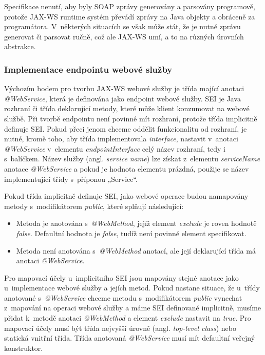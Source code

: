 \documentclass[11pt,twoside,a4paper]{book}
\begin{document}
Specifikace nenutí, aby byly SOAP zprávy generovány a parsovány programově, protože
JAX-WS runtime systém převádí zprávy na Java objekty a obráceně za programátora.
V~některých situacích se však může stát, že je nutné zprávu generovat či parsovat ručně, což ale
JAX-WS umí, a to na různých úrovních abstrakce.

\subsubsection{Implementace endpointu webové služby}
\label{subsec:implementace-endpointu-webove-sluzby}

Výchozím bodem pro tvorbu JAX-WS webové služby je třída mající anotaci {\em
@WebService}, která je definována jako endpoint webové služby. SEI je Java
rozhraní či třída deklarující metody, které může klient konzumovat na
webové službě. Při tvorbě endpointu není povinné mít rozhraní, protože třída
implicitně definuje SEI. Pokud přeci jenom chceme oddělit funkcionalitu od
rozhraní, je nutné, kromě toho, aby třída implementovala {\em interface}, nastavit v~anotaci
{\em @WebService} v~elementu {\em endpointInterface} celý název rozhraní, tedy
i s~balíčkem.
Název služby (angl. {\em service name}) lze získat z~elementu {\em serviceName}
anotace {\em @WebService} a pokud je hodnota elementu prázdná, použije se název
implementující třídy s~příponou „Service“.

Pokud třída implicitně definuje SEI, jako webové operace budou namapovány metody
s~modifikátorem {\em public}, které splňují následující:
\begin{itemize}
  \item Metoda je anotována s~{\em @WebMethod}, jejíž element {\em exclude} je
  roven hodnotě {\em false}.
Defaultní hodnota je {\em false}, tudíž není povinné
element specifikovat.
  \item Metoda není anotována s~{\em @WebMethod} anotací, ale její deklarující třída má anotaci
{\em @WebService}.
\end{itemize}

Pro mapovací účely u~implicitního SEI jsou mapovány stejné anotace jako u~implementace
webové služby a jejích metod. Pokud nastane situace, že u~třídy anotované s~{\em @WebService}
chceme metodu s~modifikátorem {\em public} vynechat z~mapování na
operaci webové služby a máme SEI definované implicitně, musíme přidat k~metodě
anotaci {\em @WebMethod} a element {\em exclude} nastavit na {\em true}.
Pro mapovací účely musí být třída nejvyšší úrovně (angl. {\em top-level class})
nebo statická vnitřní třída.
Třída anotovaná {\em @WebService} musí mít defaultní veřejný konstruktor.
\end{document}
